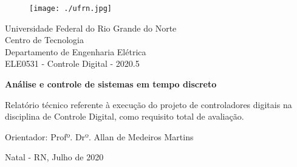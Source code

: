 \begin{titlepage}
	\begin{center}
	
	\begin{figure}[!ht]
	\centering
	\texttt{[image: ./ufrn.jpg]}
	\end{figure}

		Universidade Federal do Rio Grande do Norte \\ Centro de Tecnologia \\ Departamento de Engenharia Elétrica \\  ELE0531 - Controle Digital - 2020.5 \\
\vspace{15pt}
        
        \vspace{85pt}
        
		\textbf{\Large{Análise e controle de sistemas em tempo discreto}}\\
			
	\end{center}
\vspace{1,5cm}
	
	\begin{flushright}

   \begin{list}{}{
      \setlength{\leftmargin}{4.5cm}
      \setlength{\rightmargin}{0cm}
      \setlength{\labelwidth}{0pt}
      \setlength{\labelsep}{\leftmargin}}

      \item Relatório técnico referente à execução do projeto de controladores digitais na disciplina de Controle Digital, como requisito total de avaliação.

      \begin{list}{}{
      \setlength{\leftmargin}{0cm}
      \setlength{\rightmargin}{0cm}
      \setlength{\labelwidth}{0pt}
      \setlength{\labelsep}{\leftmargin}}


            \item Orientador: Profº. Drº. Allan de Medeiros Martins

      \end{list}
   \end{list}
\end{flushright}
\vspace{1cm}
\begin{center}
		\vspace{\fill}
		 Natal - RN, Julho de 2020
			\end{center}
\end{titlepage}
\newpage